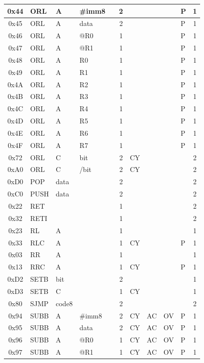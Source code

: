 \documentclass[a4paper,twoside,12pt]{book}
\begin{document}
{\begin{longtable}{|c|l|lll|c|llll|c|}
		0x44	& ORL	& A	& \#imm8&	& 2	&	&	&	& P	& 1	\\\hline
		0x45	& ORL	& A	& data	&	& 2	&	&	&	& P	& 1	\\\hline
		0x46	& ORL	& A	& @R0	&	& 1	&	&	&	& P	& 1	\\\hline
		0x47	& ORL	& A	& @R1	&	& 1	&	&	&	& P	& 1	\\\hline
		0x48	& ORL	& A	& R0	&	& 1	&	&	&	& P	& 1	\\\hline
		0x49	& ORL	& A	& R1	&	& 1	&	&	&	& P	& 1	\\\hline
		0x4A	& ORL	& A	& R2	&	& 1	&	&	&	& P	& 1	\\\hline
		0x4B	& ORL	& A	& R3	&	& 1	&	&	&	& P	& 1	\\\hline
		0x4C	& ORL	& A	& R4	&	& 1	&	&	&	& P	& 1	\\\hline
		0x4D	& ORL	& A	& R5	&	& 1	&	&	&	& P	& 1	\\\hline
		0x4E	& ORL	& A	& R6	&	& 1	&	&	&	& P	& 1	\\\hline
		0x4F	& ORL	& A	& R7	&	& 1	&	&	&	& P	& 1	\\\hline
		0x72	& ORL	& C	& bit	&	& 2	& CY	&	&	&	& 2	\\\hline
		0xA0	& ORL	& C	& /bit	&	& 2	& CY	&	&	&	& 2	\\\hline
		0xD0	& POP	& data	&	&	& 2	&	&	&	&	& 2	\\\hline
		0xC0	& PUSH	& data	&	&	& 2	&	&	&	&	& 2	\\\hline
		0x22	& RET	&	&	&	& 1	&	&	&	&	& 2	\\\hline
		0x32	& RETI	&	&	&	& 1	&	&	&	&	& 2	\\\hline
		0x23	& RL	& A	&	&	& 1	&	&	&	&	& 1	\\\hline
		0x33	& RLC	& A	&	&	& 1	& CY	&	&	& P	& 1	\\\hline
		0x03	& RR	& A	&	&	& 1	&	&	&	&	& 1	\\\hline
		0x13	& RRC	& A	&	&	& 1	& CY	&	&	& P	& 1	\\\hline
		0xD2	& SETB	& bit	&	&	& 2	&	&	&	&	& 1	\\\hline
		0xD3	& SETB	& C	&	&	& 1	& CY	&	&	&	& 1	\\\hline
		0x80	& SJMP	& code8	&	&	& 2	&	&	&	&	& 2	\\\hline
		0x94	& SUBB	& A	& \#imm8&	& 2	& CY	& AC	& OV	& P	& 1	\\\hline
		0x95	& SUBB	& A	& data	&	& 2	& CY	& AC	& OV	& P	& 1	\\\hline
		0x96	& SUBB	& A	& @R0	&	& 1	& CY	& AC	& OV	& P	& 1	\\\hline
		0x97	& SUBB	& A	& @R1	&	& 1	& CY	& AC	& OV	& P	& 1	\\\hline

\end{longtable}}
\end{document}

